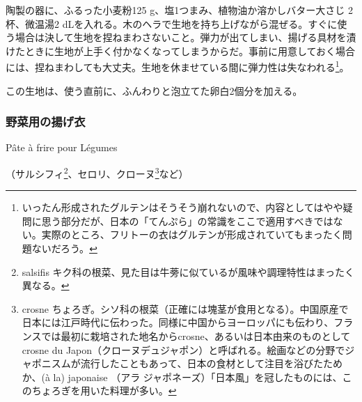 \begin{recette}
陶製の器に、ふるった小麦粉125 g、塩1つまみ、植物油か溶かしバター大さじ
2杯、微温湯2
dLを入れる。木のヘラで生地を持ち上げながら混ぜる。すぐに使う場合は決して生地を捏ねまわさないこと。弾力が出てしまい、揚げる具材を漬けたときに生地が上手く付かなくなってしまうからだ。事前に用意しておく場合には、捏ねまわしても大丈夫。生地を休ませている間に弾力性は失なわれる\footnote{いったん形成されたグルテンはそうそう崩れないので、内容としてはやや疑問に思う部分だが、日本の「てんぷら」の常識をここで適用すべきではない。実際のところ、フリトーの衣はグルテンが形成されていてもまったく問題ないだろう。}。

この生地は、使う直前に、ふんわりと泡立てた卵白2個分を加える。

\atoaki{}

\hypertarget{pate-a-frire-pour-legumes}{%
\subsubsection{野菜用の揚げ衣}\label{pate-a-frire-pour-legumes}}

\begin{frsubenv}

Pâte à frire pour Légumes

\end{frsubenv}


（サルシフィ\footnote{salsifis
  キク科の根菜、見た目は牛蒡に似ているが風味や調理特性はまったく異なる。}、セロリ、クローヌ\footnote{crosne
  ちょろぎ。シソ科の根菜（正確には塊茎が食用となる）。中国原産で日本には江戸時代に伝わった。同様に中国からヨーロッパにも伝わり、フランスでは最初に栽培された地名からcrosne、あるいは日本由来のものとしてcrosne
  du
  Japon（クローヌデュジャポン）と呼ばれる。絵画などの分野でジャポニスムが流行したこともあって、日本の食材として注目を浴びたためか、(à
  la) japonaise （アラ
  ジャポネーズ）「日本風」を冠したものには、このちょろぎを用いた料理が多い。}など）


\end{recette}
